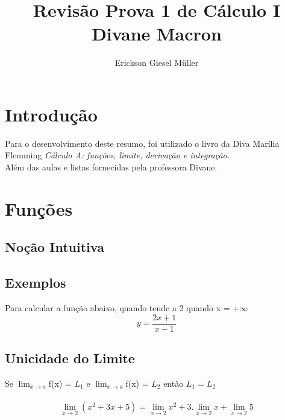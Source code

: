 \documentclass{article}
\title{Revisão Prova 1 de Cálculo I\\Divane Macron}
\author{Erickson Giesel Müller}
\begin{document}
	\maketitle
	
	\section{Introdução}
		Para o desenvolvimento deste resumo, foi utilizado o livro da Diva Marília Flemming \textit{ Cálculo A: funções, limite, derivação e integração.}\\
		Além das aulas e listas fornecidas pela professora Divane.\\
		
	\section{Funções}
		\subsection{Noção Intuitiva}
		\subsection{Exemplos}
			Para calcular a função abaixo, quando tende a 2 quando x = +$\infty$
			\begin{equation*}
				y = \frac{2x+1}{x-1}
			\end{equation*}
		\subsection{Unicidade do Limite}
			Se $\lim_{x\to a}$f(x) = $L_{1}$ e $\lim_{x\to a}$f(x) = $L_{2}$ então $L_{1} = L_{2}$
			\\ \\
			\[ \lim_{x\to 2}(x^2+3x+5) = \lim_{x\to 2}x^2 + 3.\lim_{x\to 2}x + \lim_{x\to 2}5 \]
\end{document}
